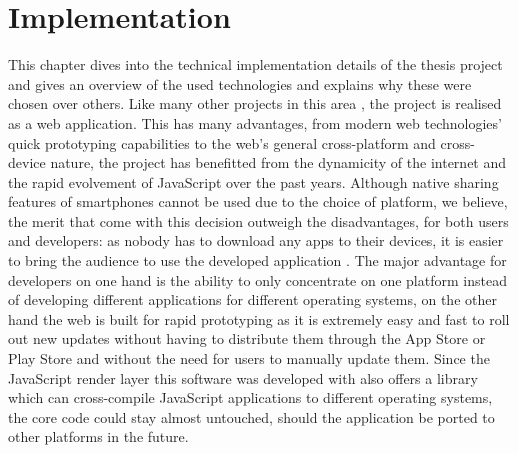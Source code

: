 \chapter{Implementation}
\label{cha:implementation}
%
%
%


This chapter dives into the technical implementation details of the thesis project and gives an overview of the used technologies and explains why these were chosen over others. Like many other projects in this area \cite{Bry:Backstage, Cheng:TreebasedOnlinePresentations, Esponda:ElectronicVotingOnTheFly, Inoue:RealTimeQuestionnaire, Teevan:MobileFeedbackDuringPresentation, Triglianos:InteractiveWebPresentationsImpress}, the project is realised as a web application. This has many advantages, from modern web technologies' quick prototyping capabilities to the web's general cross-platform and cross-device nature, the project has benefitted from the dynamicity of the internet and the rapid evolvement of JavaScript over the past years.
Although native sharing features of smartphones cannot be used due to the choice of platform, we believe, the merit that come with this decision outweigh the disadvantages, for both users and developers: as nobody has to download any apps to their devices, it is easier to bring the audience to use the developed application \cite{Triglianos:InteractiveWebPresentationsImpress}. The major advantage for developers on one hand is the ability to only concentrate on one platform instead of developing different applications for different operating systems, on the other hand the web is built for rapid prototyping as it is extremely easy and fast to roll out new updates without having to distribute them through the App Store or Play Store and without the need for users to manually update them. Since the JavaScript render layer this software was developed with also offers a library which can cross-compile JavaScript applications to different operating systems, the core code could stay almost untouched, should the application be ported to other platforms in the future.


